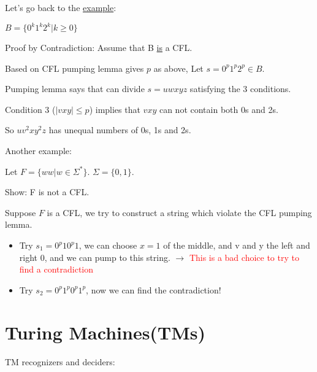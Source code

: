 Let's go back to the \hyperref[eg: 5.1]{example}:
\begin{example}
    \(B = \{ 0^k1^k2^k | k \geq 0 \} \) 

    Proof by Contradiction:
    Assume that B \underline{is} a CFL.

    Based on CFL pumping lemma gives \(p\) as above, Let \(s = 0^p1^p2^p \in B\).  

    Pumping lemma says that can divide \(s = uwxyz\) satisfying the 3 conditions. 

    Condition 3 (\(|vxy| \leq p\)) implies that \(vxy\) can not contain both 0s and 2s. 

    So \(uv^2xy^2z\) has unequal numbers of 0s, 1s and 2s.
\end{example}

Another example:
\begin{example}
    Let \(F = \{ ww|w \in \Sigma^* \} \). \(\Sigma = \{ 0, 1 \} \). 
    
    Show: F is not a CFL.  

    Suppose \(F\) is a CFL, we try to construct a string which violate the CFL pumping lemma. 

    \begin{itemize}
        \item Try \(s_1 = 0^p10^p1\), we can choose \(x = 1\) of the middle, and v and y the left and right 0, and we can pump to this string. 
        \(\rightarrow\) \textcolor{red}{This is a bad choice to try to find a contradiction} 
        \item Try \(s_2 = 0^p 1^p 0^p 1^p\), now we can find the contradiction!
    \end{itemize}
\end{example}

\section{Turing Machines(TMs)}

\begin{example}
    
\end{example}

\begin{definition}
    
\end{definition}

TM recognizers and deciders:

